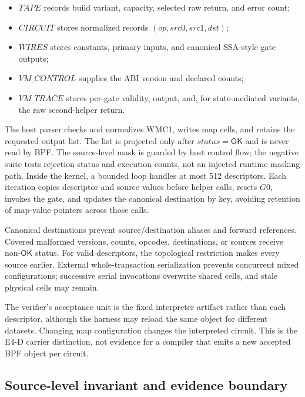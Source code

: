 \documentclass[conference]{IEEEtran}
\begin{document}
\begin{itemize}
\item $\mathit{TAPE}$ records build variant, capacity, selected raw return, and error count;
\item $\mathit{CIRCUIT}$ stores normalized records $(\mathit{op},\mathit{src0},\mathit{src1},\mathit{dst})$;
\item $\mathit{WIRES}$ stores constants, primary inputs, and canonical SSA-style gate outputs;
\item $\mathit{VM\_CONTROL}$ supplies the ABI version and declared counts;
\item $\mathit{VM\_TRACE}$ stores per-gate validity, output, and, for state-mediated variants, the raw second-helper return.
\end{itemize}

The host parser checks and normalizes WMC1, writes map cells, and retains the requested output list. The list is projected only after $\mathit{status}=\mathsf{OK}$ and is never read by BPF. The source-level mask is guarded by host control flow; the negative suite tests rejection status and execution counts, not an injected runtime masking path. Inside the kernel, a bounded loop handles at most 512 descriptors. Each iteration copies descriptor and source values before helper calls, resets $G0$, invokes the gate, and updates the canonical destination by key, avoiding retention of map-value pointers across those calls.

Canonical destinations prevent source/destination aliases and forward references. Covered malformed versions, counts, opcodes, destinations, or sources receive non-$\mathsf{OK}$ status. For valid descriptors, the topological restriction makes every source earlier. External whole-transaction serialization prevents concurrent mixed configurations; successive serial invocations overwrite shared cells, and stale physical cells may remain.

The verifier's acceptance unit is the fixed interpreter artifact rather than each descriptor, although the harness may reload the same object for different datasets. Changing map configuration changes the interpreted circuit. This is the E4-D carrier distinction, not evidence for a compiler that emits a new accepted BPF object per circuit.

\subsection{Source-level invariant and evidence boundary}
\end{document}

